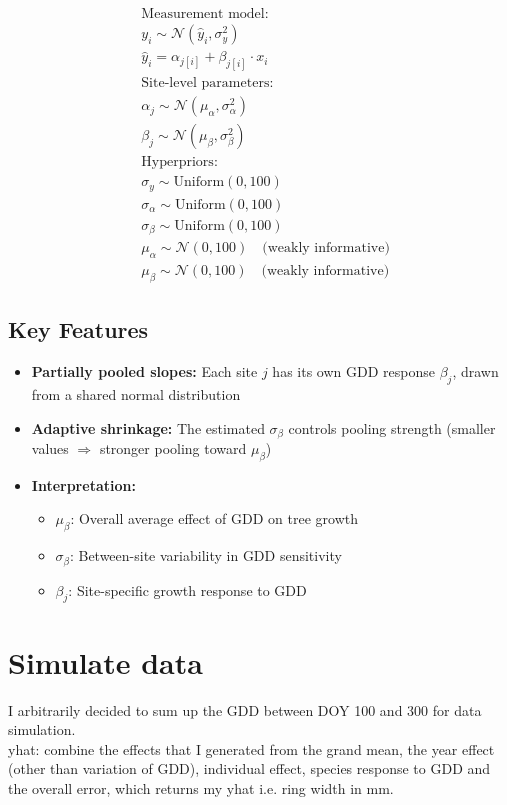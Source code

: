 \documentclass[a4paper,12pt]{article}
\begin{document}
\begin{align*}
&\text{Measurement model:} \\
&y_i \sim \mathcal{N}(\hat{y}_i, \sigma_y^2) \\
&\hat{y}_i = \alpha_{j[i]} + \beta_{j[i]} \cdot x_i \\[2ex]
%
&\text{Site-level parameters:} \\
&\alpha_j \sim \mathcal{N}(\mu_\alpha, \sigma_\alpha^2) \\
&\beta_j \sim \mathcal{N}(\mu_\beta, \sigma_\beta^2) \\[2ex]
%
&\text{Hyperpriors:} \\
&\sigma_y \sim \text{Uniform}(0, 100) \\
&\sigma_\alpha \sim \text{Uniform}(0, 100) \\
&\sigma_\beta \sim \text{Uniform}(0, 100) \\
&\mu_\alpha \sim \mathcal{N}(0, 100) \quad \text{(weakly informative)} \\
&\mu_\beta \sim \mathcal{N}(0, 100) \quad \text{(weakly informative)}
\end{align*}

\subsection*{Key Features}

\begin{itemize}
    \item \textbf{Partially pooled slopes:} Each site $j$ has its own GDD response $\beta_j$, drawn from a shared normal distribution
    \item \textbf{Adaptive shrinkage:} The estimated $\sigma_\beta$ controls pooling strength (smaller values $\Rightarrow$ stronger pooling toward $\mu_\beta$)
    \item \textbf{Interpretation:}
    \begin{itemize}
        \item $\mu_\beta$: Overall average effect of GDD on tree growth
        \item $\sigma_\beta$: Between-site variability in GDD sensitivity
        \item $\beta_j$: Site-specific growth response to GDD
    \end{itemize}
\end{itemize}




\section{Simulate data}
I arbitrarily decided to sum up the GDD between DOY 100 and 300 for data simulation. \\
yhat: combine the effects that I generated from the grand mean, the year effect (other than variation of GDD), individual effect, species response to GDD and the overall error, which returns my yhat i.e. ring width in mm.
\end{document}
